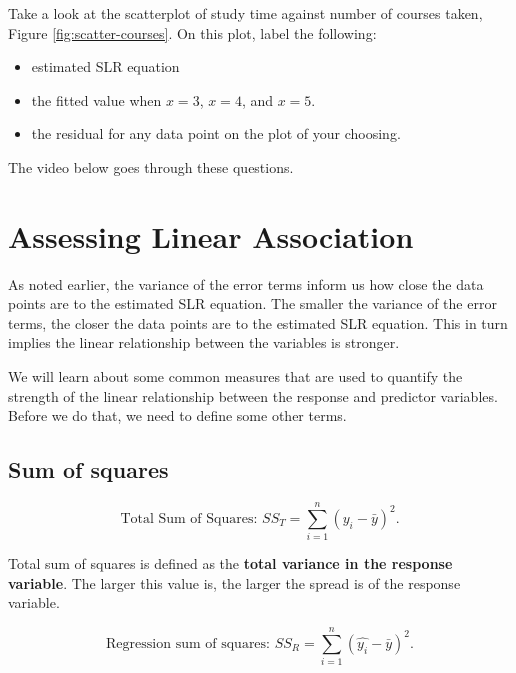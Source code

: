 \documentclass[
]{book}
\providecommand{\tightlist}{%
  \setlength{\itemsep}{0pt}\setlength{\parskip}{0pt}}
\begin{document}
Take a look at the scatterplot of study time against number of courses taken, Figure \ref{fig:scatter-courses}. On this plot, label the following:

\begin{itemize}
\tightlist
\item
  estimated SLR equation
\item
  the fitted value when \(x=3\), \(x=4\), and \(x=5\).
\item
  the residual for any data point on the plot of your choosing.
\end{itemize}

The video below goes through these questions.

\hypertarget{assessing-linear-association}{%
\section{Assessing Linear Association}\label{assessing-linear-association}}

As noted earlier, the variance of the error terms inform us how close the data points are to the estimated SLR equation. The smaller the variance of the error terms, the closer the data points are to the estimated SLR equation. This in turn implies the linear relationship between the variables is stronger.

We will learn about some common measures that are used to quantify the strength of the linear relationship between the response and predictor variables. Before we do that, we need to define some other terms.

\hypertarget{sum-of-squares}{%
\subsection{Sum of squares}\label{sum-of-squares}}

\begin{equation} 
\text{Total Sum of Squares: } SS_T = \sum\limits_{i=1}^{n} (y_i - \bar{y})^{2}.
\label{eq:SST}
\end{equation}

Total sum of squares is defined as the \textbf{total variance in the response variable}. The larger this value is, the larger the spread is of the response variable.

\begin{equation} 
\text{Regression sum of squares: } SS_R = \sum\limits_{i=1}^{n} (\hat{y_i} - \bar{y})^{2}.
\label{eq:SSR}
\end{equation}
\end{document}

